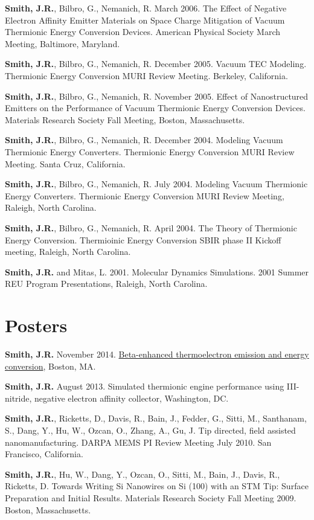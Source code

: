 \textbf{Smith, J.R.}, Bilbro, G., Nemanich, R. March 2006. The Effect of
Negative Electron Affinity Emitter Materials on Space Charge Mitigation
of Vacuum Thermionic Energy Conversion Devices. American Physical
Society March Meeting, Baltimore, Maryland.

\textbf{Smith, J.R.}, Bilbro, G., Nemanich, R. December 2005. Vacuum TEC
Modeling. Thermionic Energy Conversion MURI Review Meeting. Berkeley,
California.

\textbf{Smith, J.R.}, Bilbro, G., Nemanich, R. November 2005. Effect of
Nanostructured Emitters on the Performance of Vacuum Thermionic Energy
Conversion Devices. Materials Research Society Fall Meeting, Boston,
Massachusetts.

\textbf{Smith, J.R.}, Bilbro, G., Nemanich, R. December 2004. Modeling
Vacuum Thermionic Energy Converters. Thermionic Energy Conversion MURI
Review Meeting. Santa Cruz, California.

\textbf{Smith, J.R.}, Bilbro, G., Nemanich, R. July 2004. Modeling
Vacuum Thermionic Energy Converters. Thermionic Energy Conversion MURI
Review Meeting, Raleigh, North Carolina.

\textbf{Smith, J.R.}, Bilbro, G., Nemanich, R. April 2004. The Theory of
Thermionic Energy Conversion. Thermioinic Energy Conversion SBIR phase
II Kickoff meeting, Raleigh, North Carolina.

\textbf{Smith, J.R.} and Mitas, L. 2001. Molecular Dynamics Simulations.
2001 Summer REU Program Presentations, Raleigh, North Carolina.

\section{Posters}\label{posters}

\textbf{Smith, J.R.} November 2014.
\href{https://github.com/jrsmith3/conf-mrs_fall_2014_poster/releases}{Beta-enhanced
thermoelectron emission and energy conversion}, Boston, MA.

\textbf{Smith, J.R.} August 2013. Simulated thermionic engine
performance using III-nitride, negative electron affinity collector,
Washington, DC.

\textbf{Smith, J.R.}, Ricketts, D., Davis, R., Bain, J., Fedder, G.,
Sitti, M., Santhanam, S., Dang, Y., Hu, W., Ozcan, O., Zhang, A., Gu, J.
Tip directed, field assisted nanomanufacturing. DARPA MEMS PI Review
Meeting July 2010. San Francisco, California.

\textbf{Smith, J.R.}, Hu, W., Dang, Y., Ozcan, O., Sitti, M., Bain, J.,
Davis, R., Ricketts, D. Towards Writing Si Nanowires on Si (100) with an
STM Tip: Surface Preparation and Initial Results. Materials Research
Society Fall Meeting 2009. Boston, Massachusetts.

